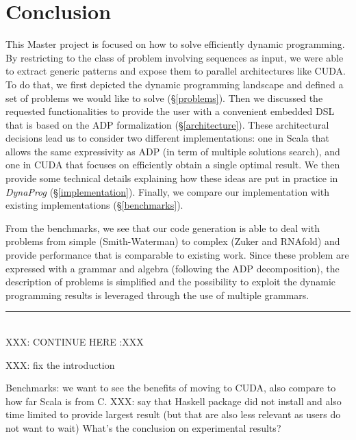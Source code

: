\section{Conclusion}
This Master project is focused on how to solve efficiently dynamic programming. By restricting to the class of problem involving sequences as input, we were able to extract generic patterns and expose them to parallel architectures like CUDA. To do that, we first depicted the dynamic programming landscape and defined a set of problems we would like to solve (\S\ref{problems}). Then we discussed the requested functionalities to provide the user with a convenient embedded DSL that is based on the ADP formalization (\S\ref{architecture}). These architectural decisions lead us to consider two different implementations: one in Scala that allows the same expressivity as ADP (in term of multiple solutions search), and one in CUDA that focuses on efficiently obtain a single optimal result. We then provide some technical details explaining how these ideas are put in practice in \textit{DynaProg} (\S\ref{implementation}). Finally, we compare our implementation with existing implementations (\S\ref{benchmarks}).

From the benchmarks, we see that our code generation is able to deal with problems from simple (Smith-Waterman) to complex (Zuker and RNAfold) and provide performance that is comparable to existing work. Since these problem are expressed with a grammar and algebra (following the ADP decomposition), the description of problems is simplified and the possibility to exploit the dynamic programming results is leveraged through the use of multiple grammars.

{\center\color{red} \noindent\rule{16cm}{0.4pt} \\ XXX: CONTINUE HERE :XXX \\}

{\color{red} XXX: fix the introduction}

{\color{red} Benchmarks: we want to see the benefits of moving to CUDA, also compare to how far Scala is from C.}
{\color{red} XXX: say that Haskell package did not install and also time limited to provide largest result (but that are also less relevant as users do not want to wait)}
{\color{red} What's the conclusion on experimental results?}

